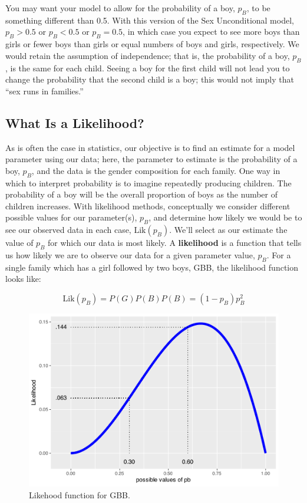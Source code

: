 \documentclass[
]{krantz}
\newcommand{\lik}{\mathrm{Lik}}
\begin{document}
You may want your model to allow for the probability of a boy, \(p_B\), to be something different than 0.5. With this version of the Sex Unconditional model, \(p_B>0.5\) or \(p_B<0.5\) or \(p_B=0.5\), in which case you expect to see more boys than girls or fewer boys than girls or equal numbers of boys and girls, respectively. We would retain the assumption of independence; that is, the probability of a boy, \(p_B\), is the same for each child. Seeing a boy for the first child will not lead you to change the probability that the second child is a boy; this would not imply that ``sex runs in families.''

\hypertarget{what-is-a-likelihood}{%
\subsection{What Is a Likelihood?}\label{what-is-a-likelihood}}

As is often the case in statistics, our objective is to find an estimate for a model parameter using our data; here, the parameter to estimate is the probability of a boy, \(p_B\), and the data is the gender composition for each family. One way in which to interpret probability is to imagine repeatedly producing children. The probability of a boy will be the overall proportion of boys as the number of children increases.
With likelihood methods, conceptually we consider different possible values for our parameter(s), \(p_B\), and determine how likely we would be to see our observed data in each case, \(\lik(p_B)\). We'll select as our estimate the value of \(p_B\) for which our data is most likely. A \textbf{likelihood}  is a function that tells us how likely we are to observe our data for a given parameter value, \(p_B\). For a single family which has a girl followed by two boys, GBB, the likelihood function looks like:

\begin{equation*}
 \lik (p_B) = P(G)P(B)P(B) = (1-p_B)p_B^2
\end{equation*}

\begin{figure}

{\centering \includegraphics[width=0.9\linewidth]{bookdown-BeyondMLR_files/figure-latex/lik1-1} 

}

\caption{Likehood function for GBB.}\label{fig:lik1}
\end{figure}
\end{document}
